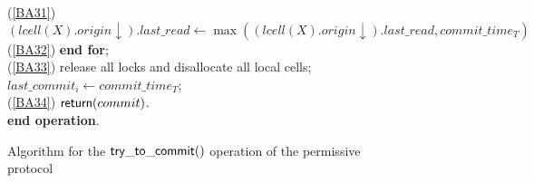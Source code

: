 \begin{figure}[htb!]
{{\begin{minipage}[t]{150mm}
\begin{tabbing}
(\ref{BA31}) \>\>
   $(lcell(X).origin \downarrow).last\_read \leftarrow 
     \max((lcell(X).origin \downarrow).last\_read, commit\_time_T)$ \\

(\ref{BA32}) \> {\bf end for};\\

(\ref{BA33}) \> release all locks and disallocate all  local cells; 
               $last\_commit_i \leftarrow commit\_time_T$;\\
	
(\ref{BA34}) \> ${\sf return}(commit)$. \\

{\bf end operation}.

\end{tabbing}
\normalsize
\end{minipage}
}
\caption{Algorithm for the ${\sf try\_to\_commit()}$ operation of 
         the permissive protocol}
\label{fig:ttc-V22-protocol}
}
\end{figure}
 
